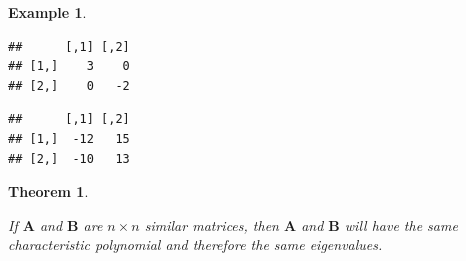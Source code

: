 \documentclass[
]{book}
\newenvironment{Shaded}{\begin{snugshade}}{\end{snugshade}}
\newcommand{\KeywordTok}[1]{\textcolor[rgb]{0.13,0.29,0.53}{\textbf{#1}}}
\newcommand{\NormalTok}[1]{#1}
\newcommand{\OperatorTok}[1]{\textcolor[rgb]{0.81,0.36,0.00}{\textbf{#1}}}
\newcommand{\StringTok}[1]{\textcolor[rgb]{0.31,0.60,0.02}{#1}}
\newtheorem{theorem}{Theorem}[chapter]
\theoremstyle{definition}
\theoremstyle{definition}
\newtheorem{example}{Example}[chapter]
\theoremstyle{definition}
\theoremstyle{remark}
\begin{document}
\begin{example}
\begin{Shaded}
\end{Shaded}

\begin{verbatim}
##      [,1] [,2]
## [1,]    3    0
## [2,]    0   -2
\end{verbatim}

\begin{Shaded}
\end{Shaded}

\begin{verbatim}
##      [,1] [,2]
## [1,]  -12   15
## [2,]  -10   13
\end{verbatim}

\end{example}

\begin{theorem}
\protect\hypertarget{thm:unlabeled-div-176}{}\label{thm:unlabeled-div-176}

If \(\mathbf{A}\) and \(\mathbf{B}\) are \(n \times n\) similar matrices, then \(\mathbf{A}\) and \(\mathbf{B}\) will have the same characteristic polynomial and therefore the same eigenvalues.

\end{theorem}
\end{document}

